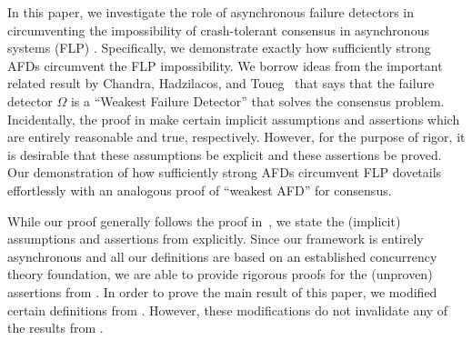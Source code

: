 \documentclass[11pt]{article}
\numberwithin{theorem}{section}
\begin{document}
In this paper, we investigate the role of asynchronous failure detectors in circumventing the impossibility of crash-tolerant consensus in asynchronous systems (FLP) \cite{FLP}. Specifically, we demonstrate exactly how sufficiently strong AFDs circumvent
the FLP impossibility.  We borrow ideas from the important related result by Chandra, Hadzilacos,
and Toueg~\cite{chan:twfdf} that says that the failure detector $\Omega$ is a
``Weakest Failure Detector'' that solves the consensus
problem. Incidentally, the proof in \cite{chan:twfdf} make certain implicit assumptions
and assertions which are entirely reasonable and true, respectively. However, for
the purpose of rigor, it is desirable that these assumptions be explicit
and these assertions be proved. Our demonstration of how sufficiently strong AFDs circumvent FLP dovetails effortlessly with an analogous proof of  ``weakest AFD'' for consensus.


While our proof generally follows the proof in~\cite{chan:twfdf}, we
state the (implicit) assumptions and assertions from \cite{chan:twfdf} explicitly.
Since our framework is entirely asynchronous and all our definitions are based
on an established concurrency theory foundation, we are able to provide
rigorous proofs for the (unproven) assertions from \cite{chan:twfdf}. In order to prove the main result of this paper, we modified certain definitions from \cite{cornejoetalAFD-TR}. However, these modifications do not invalidate any of the results from \cite{cornejoetalAFD,cornejoetalAFD-TR}.
\end{document}
